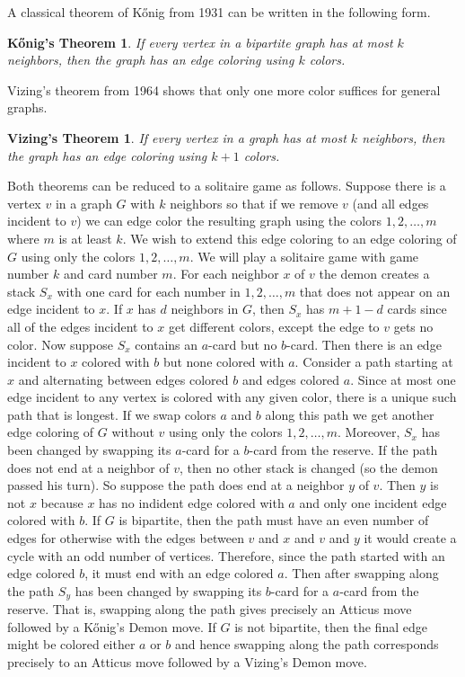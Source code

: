 \documentclass[12pt]{article}
\theoremstyle{plain}
\newtheorem*{konig}{K\H{o}nig's Theorem}
\newtheorem*{vizing}{Vizing's Theorem}
\theoremstyle{definition}
\theoremstyle{remark}
\begin{document}
A classical theorem of K\H{o}nig from 1931 \cite{konig} can be written in the following form.

\begin{konig}
If every vertex in a bipartite graph has at most $k$ neighbors, then the graph has an edge coloring using $k$ colors.
\end{konig}

Vizing's theorem from 1964 \cite{vizing} shows that only one more color suffices for general graphs.

\begin{vizing}
If every vertex in a graph has at most $k$ neighbors, then the graph has an edge coloring using $k + 1$ colors.
\end{vizing}

Both theorems can be reduced to a solitaire game as follows. Suppose there is a vertex $v$ in a graph $G$ with $k$ neighbors so that if we remove $v$ (and all edges incident to $v$) we can edge color the resulting graph using the colors $1, 2, \ldots, m$ where $m$ is at least $k$.  We wish to extend this edge coloring to an edge coloring of $G$ using only the colors $1, 2, \ldots, m$.  We will play a solitaire game with game number $k$ and card number $m$.  For each neighbor $x$ of $v$ the demon creates a stack $S_x$ with one card for each number in $1,2,\ldots, m$ that does not appear on an edge incident to $x$.  If $x$ has $d$ neighbors in $G$, then $S_x$ has $m + 1 - d$ cards since all of the edges incident to $x$ get different colors, except the edge to $v$ gets no color.  Now suppose $S_x$ contains an $a$-card but no $b$-card.  Then there is an edge incident to $x$ colored with $b$ but none colored with $a$.  Consider a path starting at $x$ and alternating between edges colored $b$ and edges colored $a$.  Since at most one edge incident to any vertex is colored with any given color, there is a unique such path that is longest.  If we swap colors $a$ and $b$ along this path we get another edge coloring of $G$ without $v$ using only the colors $1, 2, \ldots, m$.  Moreover, $S_x$ has been changed by swapping its $a$-card for a $b$-card from the reserve.  If the path does not end at a neighbor of $v$, then no other stack is changed (so the demon passed his turn).  So suppose the path does end at a neighbor $y$ of $v$.  Then $y$ is not $x$ because $x$ has no indident edge colored with $a$ and only one incident edge colored with $b$. If $G$ is bipartite, then the path must have an even number of edges for otherwise with the edges between $v$ and $x$ and $v$ and $y$ it would create a cycle with an odd number of vertices.  Therefore, since the path started with an edge colored $b$, it must end with an edge colored $a$.  Then after swapping along the path $S_y$ has been changed by swapping its $b$-card for a $a$-card from the reserve.  That is, swapping along the path gives precisely an Atticus move followed by a K\H{o}nig's Demon move.  If $G$ is not bipartite, then the final edge might be colored either $a$ or $b$ and hence swapping along the path corresponds precisely to an Atticus move followed by a Vizing's Demon move.  
\end{document}
